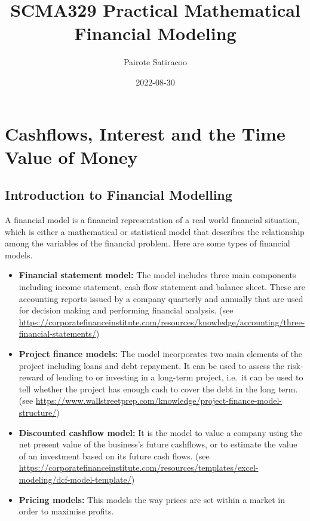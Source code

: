 \documentclass[
]{book}
\title{SCMA329 Practical Mathematical Financial Modeling}
\author{Pairote Satiracoo}
\date{2022-08-30}
\theoremstyle{definition}
\theoremstyle{definition}
\theoremstyle{definition}
\theoremstyle{definition}
\theoremstyle{remark}
\begin{document}
\maketitle

{
\setcounter{tocdepth}{1}
\tableofcontents
}
\hypertarget{cashflows-interest-and-the-time-value-of-money}{%
\chapter{Cashflows, Interest and the Time Value of Money}\label{cashflows-interest-and-the-time-value-of-money}}

\hypertarget{introduction-to-financial-modelling}{%
\section{Introduction to Financial Modelling}\label{introduction-to-financial-modelling}}

A financial model is a financial representation of a real world
financial situation, which is either a mathematical or statistical model
that describes the relationship among the variables of the financial
problem. Here are some types of financial models.

\begin{itemize}
\item
  \textbf{Financial statement model:} The model includes three main
  components including income statement, cash flow statement and
  balance sheet. These are accounting reports issued by a company
  quarterly and annually that are used for decision making and
  performing financial analysis. (see
  \url{https://corporatefinanceinstitute.com/resources/knowledge/accounting/three-financial-statements/})
\item
  \textbf{Project finance models:} The model incorporates two main elements
  of the project including loans and debt repayment. It can be used to
  assess the risk-reward of lending to or investing in a long-term
  project, i.e.~it can be used to tell whether the project has enough
  cash to cover the debt in the long term. (see
  \url{https://www.wallstreetprep.com/knowledge/project-finance-model-structure/})
\item
  \textbf{Discounted cashflow model:} It is the model to value a company
  using the net present value of the business's future cashflows, or
  to estimate the value of an investment based on its future cash
  flows. (see
  \url{https://corporatefinanceinstitute.com/resources/templates/excel-modeling/dcf-model-template/})
\item
  \textbf{Pricing models:} This models the way prices are set within a
  market in order to maximise profits.
\end{itemize}
\end{document}
